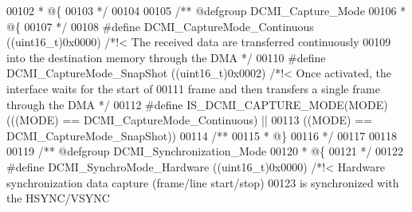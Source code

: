 \begin{DoxyCode}
00102 \textcolor{comment}{  * @\{}
00103 \textcolor{comment}{  */}
00104 
00105 \textcolor{comment}{/** @defgroup DCMI\_Capture\_Mode }
00106 \textcolor{comment}{  * @\{}
00107 \textcolor{comment}{  */}
00108 \textcolor{preprocessor}{#}\textcolor{preprocessor}{define} \textcolor{preprocessor}{DCMI\_CaptureMode\_Continuous}    \textcolor{preprocessor}{(}\textcolor{preprocessor}{(}\textcolor{preprocessor}{uint16\_t}\textcolor{preprocessor}{)}0x0000\textcolor{preprocessor}{)} \textcolor{comment}{/*!< The received data are transferred
       continuously }
00109 \textcolor{comment}{                                                               into the destination memory through the
       DMA */}
00110 \textcolor{preprocessor}{#}\textcolor{preprocessor}{define} \textcolor{preprocessor}{DCMI\_CaptureMode\_SnapShot}      \textcolor{preprocessor}{(}\textcolor{preprocessor}{(}\textcolor{preprocessor}{uint16\_t}\textcolor{preprocessor}{)}0x0002\textcolor{preprocessor}{)} \textcolor{comment}{/*!< Once activated, the interface waits for
       the start of }
00111 \textcolor{comment}{                                                               frame and then transfers a single frame
       through the DMA */}
00112 \textcolor{preprocessor}{#}\textcolor{preprocessor}{define} \textcolor{preprocessor}{IS\_DCMI\_CAPTURE\_MODE}\textcolor{preprocessor}{(}\textcolor{preprocessor}{MODE}\textcolor{preprocessor}{)}\textcolor{preprocessor}{(}\textcolor{preprocessor}{(}\textcolor{preprocessor}{(}\textcolor{preprocessor}{MODE}\textcolor{preprocessor}{)} \textcolor{preprocessor}{==} DCMI_CaptureMode_Continuous\textcolor{preprocessor}{)} \textcolor{preprocessor}{||}
00113                                    \textcolor{preprocessor}{(}\textcolor{preprocessor}{(}\textcolor{preprocessor}{MODE}\textcolor{preprocessor}{)} \textcolor{preprocessor}{==} DCMI_CaptureMode_SnapShot\textcolor{preprocessor}{)}\textcolor{preprocessor}{)}
00114 \textcolor{comment}{/**}
00115 \textcolor{comment}{  * @\}}
00116 \textcolor{comment}{  */}
00117 
00118 
00119 \textcolor{comment}{/** @defgroup DCMI\_Synchronization\_Mode}
00120 \textcolor{comment}{  * @\{}
00121 \textcolor{comment}{  */}
00122 \textcolor{preprocessor}{#}\textcolor{preprocessor}{define} \textcolor{preprocessor}{DCMI\_SynchroMode\_Hardware}    \textcolor{preprocessor}{(}\textcolor{preprocessor}{(}\textcolor{preprocessor}{uint16\_t}\textcolor{preprocessor}{)}0x0000\textcolor{preprocessor}{)} \textcolor{comment}{/*!< Hardware synchronization data capture
       (frame/line start/stop)}
00123 \textcolor{comment}{                                                             is synchronized with the HSYNC/VSYNC
}
\end{DoxyCode}
